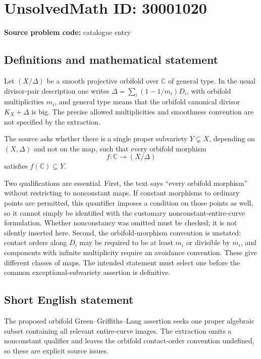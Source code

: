 \documentclass[11pt]{article}
\newcommand{\C}{\mathbb{C}}
\begin{document}
\section*{UnsolvedMath ID: 30001020}
\textbf{Source problem code:} catalogue entry
\subsection{Definitions and mathematical statement}
Let \((X/\Delta)\) be a smooth projective orbifold over \(\C\) of general type. In the usual divisor-pair description one writes \(\Delta=\sum_i(1-1/m_i)D_i\), with orbifold multiplicities \(m_i\), and general type means that the orbifold canonical divisor \(K_X+\Delta\) is big. The precise allowed multiplicities and smoothness convention are not specified by the extraction.

The source asks whether there is a single proper subvariety \(Y\subsetneq X\), depending on \((X,\Delta)\) and not on the map, such that every orbifold morphism
\[
f:\C\longrightarrow(X/\Delta)
\]
satisfies \(f(\C)\subseteq Y\).

Two qualifications are essential. First, the text says ``every orbifold morphism'' without restricting to nonconstant maps. If constant morphisms to ordinary points are permitted, this quantifier imposes a condition on those points as well, so it cannot simply be identified with the customary nonconstant-entire-curve formulation. Whether nonconstancy was omitted must be checked; it is not silently inserted here. Second, the orbifold-morphism convention is unstated: contact orders along \(D_i\) may be required to be at least \(m_i\) or divisible by \(m_i\), and components with infinite multiplicity require an avoidance convention. These give different classes of maps. The intended statement must select one before the common exceptional-subvariety assertion is definitive.
\subsection{Short English statement}
The proposed orbifold Green--Griffiths--Lang assertion seeks one proper algebraic subset containing all relevant entire-curve images. The extraction omits a nonconstant qualifier and leaves the orbifold contact-order convention undefined, so these are explicit source issues.
\end{document}
